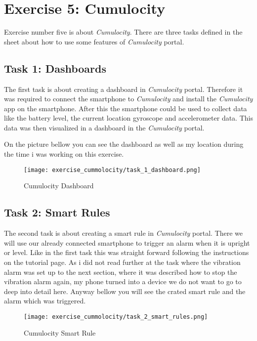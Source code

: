\section{Exercise 5: Cumulocity}
Exercise number five is about \textit{Cumulocity}. There are three tasks defined in the sheet about how to 
use some features of \textit{Cumulocity} portal.

\subsection{Task 1: Dashboards}
The first task is about creating a dashboard in \textit{Cumulocity} portal. Therefore it was required to 
connect the smartphone to \textit{Cumulocity} and install the \textit{Cumulocity} app on the smartphone.
After this the smartphone could be used to collect data like the battery level, the current location gyroscope 
and accelerometer data. This data was then visualized in a dashboard in the \textit{Cumulocity} portal.

On the picture bellow you can see the dashboard as well as my location during the time i was working on this
exercise.
\begin{figure}[H]
    \centering
    \texttt{[image: exercise\_cummolocity/task\_1\_dashboard.png]}
    \caption{Cumulocity Dashboard}
    \label{fig:cumulocity_dashboard}
\end{figure}

\subsection{Task 2: Smart Rules}
The second task is about creating a smart rule in \textit{Cumulocity} portal. 
There we will use our already connected smartphone to trigger an alarm when it is upright or level.
Like in the first task this was straight forward following the instructions on the tutorial page.
As i did not read further at the task where the vibration alarm was set up to the next section, where it 
was described how to stop the vibration alarm again, my phone turned into a device we do not want to go 
to deep into detail here. Anyway bellow you will see the crated smart rule and the alarm which was triggered.

\begin{figure}[H]
    \centering
    \texttt{[image: exercise\_cummolocity/task\_2\_smart\_rules.png]}
    \caption{Cumulocity Smart Rule}
    \label{fig:cumulocity_smart_rule}
\end{figure}

